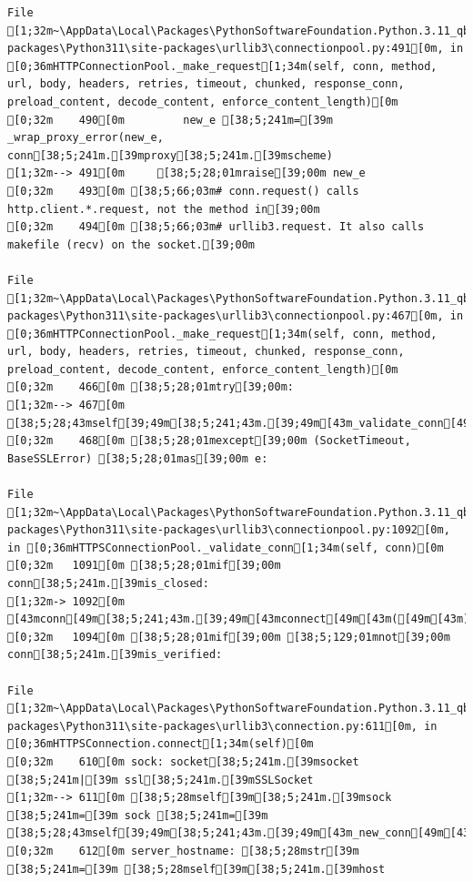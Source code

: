 \documentclass[
  letterpaper,
]{book}
\begin{document}
\begin{verbatim}
File [1;32m~\AppData\Local\Packages\PythonSoftwareFoundation.Python.3.11_qbz5n2kfra8p0\LocalCache\local-packages\Python311\site-packages\urllib3\connectionpool.py:491[0m, in [0;36mHTTPConnectionPool._make_request[1;34m(self, conn, method, url, body, headers, retries, timeout, chunked, response_conn, preload_content, decode_content, enforce_content_length)[0m
[0;32m    490[0m         new_e [38;5;241m=[39m _wrap_proxy_error(new_e, conn[38;5;241m.[39mproxy[38;5;241m.[39mscheme)
[1;32m--> 491[0m     [38;5;28;01mraise[39;00m new_e
[0;32m    493[0m [38;5;66;03m# conn.request() calls http.client.*.request, not the method in[39;00m
[0;32m    494[0m [38;5;66;03m# urllib3.request. It also calls makefile (recv) on the socket.[39;00m

File [1;32m~\AppData\Local\Packages\PythonSoftwareFoundation.Python.3.11_qbz5n2kfra8p0\LocalCache\local-packages\Python311\site-packages\urllib3\connectionpool.py:467[0m, in [0;36mHTTPConnectionPool._make_request[1;34m(self, conn, method, url, body, headers, retries, timeout, chunked, response_conn, preload_content, decode_content, enforce_content_length)[0m
[0;32m    466[0m [38;5;28;01mtry[39;00m:
[1;32m--> 467[0m     [38;5;28;43mself[39;49m[38;5;241;43m.[39;49m[43m_validate_conn[49m[43m([49m[43mconn[49m[43m)[49m
[0;32m    468[0m [38;5;28;01mexcept[39;00m (SocketTimeout, BaseSSLError) [38;5;28;01mas[39;00m e:

File [1;32m~\AppData\Local\Packages\PythonSoftwareFoundation.Python.3.11_qbz5n2kfra8p0\LocalCache\local-packages\Python311\site-packages\urllib3\connectionpool.py:1092[0m, in [0;36mHTTPSConnectionPool._validate_conn[1;34m(self, conn)[0m
[0;32m   1091[0m [38;5;28;01mif[39;00m conn[38;5;241m.[39mis_closed:
[1;32m-> 1092[0m     [43mconn[49m[38;5;241;43m.[39;49m[43mconnect[49m[43m([49m[43m)[49m
[0;32m   1094[0m [38;5;28;01mif[39;00m [38;5;129;01mnot[39;00m conn[38;5;241m.[39mis_verified:

File [1;32m~\AppData\Local\Packages\PythonSoftwareFoundation.Python.3.11_qbz5n2kfra8p0\LocalCache\local-packages\Python311\site-packages\urllib3\connection.py:611[0m, in [0;36mHTTPSConnection.connect[1;34m(self)[0m
[0;32m    610[0m sock: socket[38;5;241m.[39msocket [38;5;241m|[39m ssl[38;5;241m.[39mSSLSocket
[1;32m--> 611[0m [38;5;28mself[39m[38;5;241m.[39msock [38;5;241m=[39m sock [38;5;241m=[39m [38;5;28;43mself[39;49m[38;5;241;43m.[39;49m[43m_new_conn[49m[43m([49m[43m)[49m
[0;32m    612[0m server_hostname: [38;5;28mstr[39m [38;5;241m=[39m [38;5;28mself[39m[38;5;241m.[39mhost


\end{verbatim}
\end{document}
